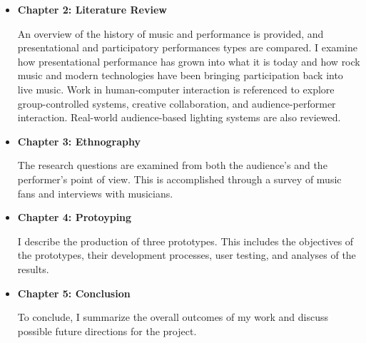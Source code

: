 \begin{itemize}
	\item \textbf{Chapter 2: Literature Review}
	
	An overview of the history of music and performance is provided, and presentational and participatory performances types are compared. I examine how presentational performance has grown into what it is today and how rock music and modern technologies have been bringing participation back into live music. Work in human-computer interaction is referenced to explore group-controlled systems, creative collaboration, and audience-performer interaction. Real-world audience-based lighting systems are also reviewed.
			
	\item \textbf{Chapter 3: Ethnography}
	
	The research questions are examined from both the audience's and the performer's point of view. This is accomplished through a survey of music fans and interviews with musicians.
	
	\item \textbf{Chapter 4: Protoyping}
	
	I describe the production of three prototypes. This includes the objectives of the prototypes, their development processes, user testing, and analyses of the results.
		
	\item \textbf{Chapter 5: Conclusion}
	
	To conclude, I summarize the overall outcomes of my work and discuss possible future directions for the project.
\end{itemize}
